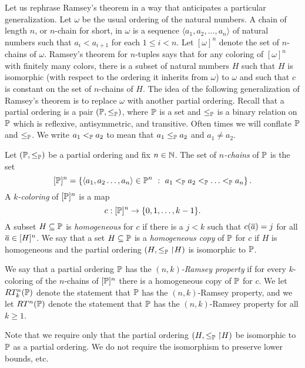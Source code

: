 Let us rephrase Ramsey's theorem  in a way that
anticipates a particular generalization.
Let $\omega$ be the usual ordering of the natural numbers.
A chain of length $n$, or $n$-chain for short, in $\omega$ is a sequence
$\langle a_1,a_2,\ldots,a_n\rangle$ of natural numbers
such that $a_i<a_{i+1}$ for each $1\leq i<n$.
Let $[\omega]^n$ denote the set of $n$-chains of $\omega$.
Ramsey's theorem for $n$-tuples says that for any
coloring of $[\omega]^n$ with finitely many colors,
there is a subset of natural numbers $H$ such that
$H$ is isomorphic (with respect to the ordering it
inherits from $\omega$) to $\omega$ and such that
$c$ is constant on the set of $n$-chains of $H$.
The idea of the following generalization of Ramsey's
theorem is to replace $\omega$ with another partial ordering.
Recall that a partial ordering is a pair $(\mathbb{P},\leq_{\mathbb{P}})$,
where $\mathbb{P}$ is a set and $\leq_{\mathbb{P}}$ is a binary relation on $\mathbb{P}$
which is reflexive, antisymmetric, and transitive.
Often times we will conflate $\mathbb{P}$ and $\leq_{\mathbb{P}}$.
We write $a_1<_{\mathbb{P}}a_2$ to mean that $a_1\leq_{\mathbb{P}}a_2$ and $a_1\neq a_2$.

\begin{definition}
Let $(\mathbb{P},\leq_{\mathbb{P}})$ be a partial ordering and fix $n\in\mathbb{N}$.
The set of $n$\textit{-chains} of $\mathbb{P}$ is the set
$$[\mathbb{P}]^n=\left\{\left\langle a_1,a_2\ldots,a_n\right\rangle\in\mathbb{P}^n\ :\ a_1<_{\mathbb{P}}a_2<_{\mathbb{P}}\ldots <_{\mathbb{P}}a_n\right\}.$$
A $k$\textit{-coloring} of $[\mathbb{P}]^n$ is a map
$$c:[\mathbb{P}]^n\to\{0,1,\ldots,k-1\}.$$
A subset $H\subseteq\mathbb{P}$ is \textit{homogeneous} for $c$ if there
is a $j<k$ such that $c(\overline{a})=j$ for all $\overline{a}\in[H]^n$.
We say that a set $H\subseteq\mathbb{P}$ is a \textit{homogeneous copy} of $\mathbb{P}$
for $c$ if $H$ is homogeneous and the partial ordering
$(H,\leq_{\mathbb{P}}{\upharpoonright} H)$ is isomorphic to $\mathbb{P}$.
\end{definition}

\begin{definition}\label{D:RamseyPOsets} 
We say that a partial ordering $\mathbb{P}$ has the $(n,k)$\textit{-Ramsey property}
if for every $k$-coloring of the $n$-chains of $[\mathbb{P}]^n$
there is a homogeneous copy of $\mathbb{P}$ for $c$.
We let $RT^n_k(\mathbb{P})$ denote the statement that $\mathbb{P}$ has
the $(n,k)$-Ramsey property, and we let $RT^n(\mathbb{P})$
denote the statement that $\mathbb{P}$ has the $(n,k)$-Ramsey property for all $k\geq 1$.
\end{definition}

Note that we require only that the partial ordering $(H,\leq_{\mathbb{P}}{\upharpoonright} H)$
be isomorphic to $\mathbb{P}$ as a partial ordering.
We do not require the isomorphism to preserve lower bounds, etc.

